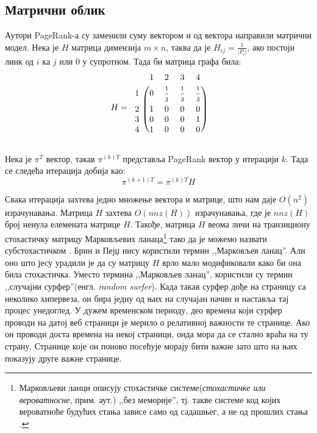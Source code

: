 \subsection{Матрични облик}
Аутори  PageRank-а су заменили суму вектором и од вектора направили матрични модел. Нека је $H$ матрица димензија $m\times n$, таква да је $H_{ij}=\frac{1}{\left |P_{i}  \right |}$, ако постоји линк од $i$ ка $j$ или $0$ у супротном. Тада би матрица графа била:
\[
H=
\begin{blockarray}{ccccc}
& 1 & 2 & 3 & 4  \\
\begin{block}{c(cccc)}
  1 & 0 & \frac{\strut 1}{\strut 3} & \frac{\strut 1}{\strut 3} & \frac{\strut 1}{\strut 3}  \\
  2 & 1 & 0 & 0 & 0  \\
  3 & 0 & 0 & 0 & 1  \\
  4 & 1 & 0 & 0 & 0  \\
\end{block}
\end{blockarray}
 \]

Нека је $\pi^{T}$ вектор, такав $\pi^{(k)T}$ представља PageRank вектор у итерацији $k$. Тада се следећа итерација добија као:
\begin{equation}
\pi^{(k+1) T}=\pi^{(k)T}H
\end{equation}

Свака итерација захтева једно множење вектора и матрице, што нам даје $O(n^{2})$
израчунавања. Матрица $H$ захтева $O(nnz(H))$ израчунавања, где је $nnz(H)$ број ненула елемената матрице $H$. Такође, матрица $H$ веома личи на транзициону стохастичку матрицу Марковљевих ланаца\footnote{Марковљеви ланци описују стохастичке системе(\emph{стохастичке или вероватносне}, прим. аут.) ,,без меморије'', тј. такве системе код којих вероватноће будућих стања зависе само од садашњег, а не од прошлих стања \cite{filipovic2006operatori}.} тако да је можемо назвати субстохастичком \cite[Ch 4.2]{langville2011google}. Брин и Пејџ нису користили термин ,,Марковљев ланац''. Али оно што јесу урадили је да су матрицу $H$ врло мало модификовали како би она била стохастичка. Уместо термина ,,Марковљев ланац'', користили су термин ,,случајни сурфер''(енгл. \emph{random surfer}). Када такав сурфер дође на страницу са неколико хипервеза, он бира једну од њих на случајан начин и наставља тај процес унедоглед. У дужем временском периоду, део времена који сурфер проводи на датој веб страници је мерило о релативној важности те странице. Ако он проводи доста времена на некој страници, онда мора да се стално враћа на ту страну. Странице које он поново посећује морају бити важне зато што на њих показују друге важне странице.

